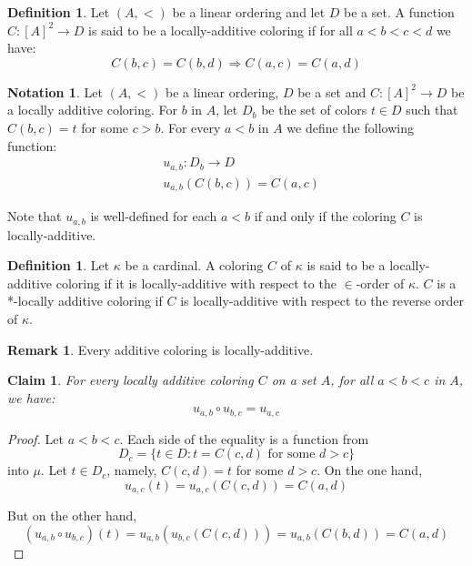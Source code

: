\documentclass[11pt]{amsart}
\theoremstyle{plain}
\newtheorem{claim}[theorem]{Claim}
\theoremstyle{definition} %
\newtheorem{definition}[theorem]{Definition}
\newtheorem{remark}[theorem]{Remark}
\newtheorem{notation}[theorem]{Notation}
\theoremstyle{remark}
\begin{document}
\begin{definition}\label{definition locally-additive}
Let $(A,<)$ be a linear ordering and let $D$ be a set. A function $C:[A]^2\to D$
is said to be a locally-additive coloring if for all $a<b<c<d$ we have:
\[
C(b,c)=C(b,d) \Rightarrow C(a,c)=C(a,d)
\]
\end{definition}

\begin{notation}\label{notation local additivity}
Let $(A,<)$ be a linear ordering, $D$ be a set and $C:[A]^2\to D$ be a locally additive coloring.
For $b$ in $A$, let $D_b$ be the set
of colors $t \in D$ such that $C(b,c)=t$ for some $c>b$. For every $a<b$ in $A$ we define the following function:
\begin{align*}
&u_{a,b}:D_b \to D\\
&u_{a,b}(C(b,c))=C(a,c)
\end{align*}
\end{notation}
Note that $u_{a,b}$ is well-defined  for each $a<b$ if and only if the coloring $C$ is locally-additive.

\begin{definition}
Let $\kappa$ be a cardinal. A coloring $C$ of $\kappa$
is said to be a locally-additive coloring if it is locally-additive with respect to the $\in$-order of $\kappa$. $C$ is a *-locally additive coloring  if $C$ is locally-additive with respect to the reverse order of $\kappa$.
\end{definition}

\begin{remark}
Every additive coloring is locally-additive.
\end{remark}

\begin{claim}\label{C^* is additive}
For every locally additive coloring $C$ on a set $A$, for all $a<b<c$ in $A$, we have:
\[
u_{a,b} \circ u_{b,c}=u_{a,c}
\]
\end{claim}

\begin{proof}
Let $a<b<c$. Each side of the equality is a function from \[D_c=\{t \in D:t=C(c,d) \text{ for some } d>c\}
\] into $\mu$. Let $t \in D_c$, namely, $C(c,d)=t$ for some $d>c$. On the one hand,
\[
u_{a,c}(t)=u_{a,c}(C(c,d))=C(a,d)
\]

But on the other hand,
\[
(u_{a,b} \circ u_{b,c})(t)=u_{a,b}(u_{b,c}(C(c,d)))=u_{a,b}(C(b,d))=C(a,d)
\]
\end{proof}
\end{document}
